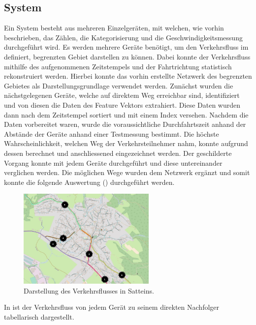\subsection{System}
Ein System besteht aus mehreren Einzelgeräten, mit welchen, wie vorhin beschrieben, das Zählen, die Kategorisierung und die Geschwindigkeitsmessung durchgeführt wird. Es werden mehrere Geräte benötigt, um den Verkehrsfluss im definiert, begrenzten Gebiet darstellen zu können. Dabei konnte der Verkehrsfluss mithilfe des aufgenommenen Zeitstempels und der Fahrtrichtung statistisch rekonstruiert werden. Hierbei konnte das vorhin erstellte Netzwerk des begrenzten Gebietes als Darstellungsgrundlage verwendet werden. Zunächst wurden die nächstgelegenen Geräte, welche auf direktem Weg erreichbar sind, identifiziert und von diesen die Daten des Feature Vektors extrahiert. Diese Daten wurden dann nach dem Zeitstempel sortiert und mit einem Index versehen. Nachdem die Daten vorbereitet waren, wurde die voraussichtliche Durchfahrtszeit anhand der Abstände der Geräte anhand einer Testmessung bestimmt. Die höchste Wahrscheinlichkeit, welchen Weg der Verkehrsteilnehmer nahm, konnte aufgrund dessen berechnet und anschliessened eingezeichnet werden. Der geschilderte Vorgang konnte mit jedem Geräte durchgeführt und diese untereinander verglichen werden. Die möglichen Wege wurden dem Netzwerk ergänzt und somit konnte die folgende Auswertung () durchgeführt werden. 

\begin{figure}[H]
  \centering
  \includegraphics[width=0.6\textwidth]{Resultate/Auswertung.jpg} 
  \caption{Darstellung des Verkehrsflusses in Satteins.}
  \label{bAuswertung}
\end{figure}
In  ist der Verkehrsfluss von jedem Gerät zu seinem direkten Nachfolger tabellarisch dargestellt. 

\setlength\tabcolsep{5pt}

